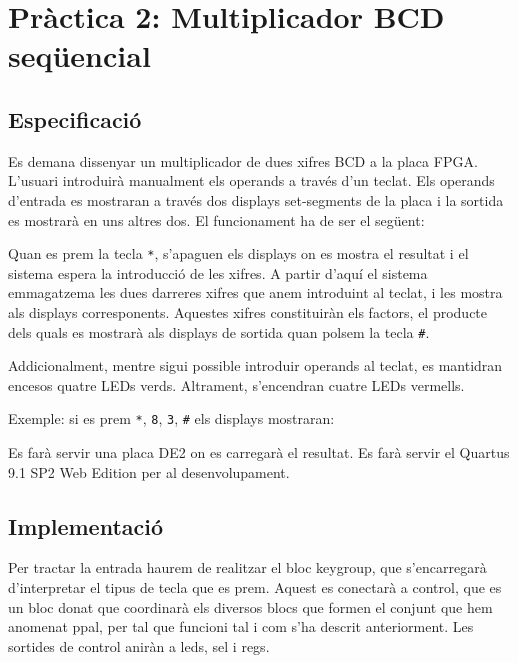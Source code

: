 \chapter{Pràctica 2: Multiplicador BCD seqüencial}

\section{Especificació}

Es demana dissenyar un multiplicador de dues xifres BCD a la placa FPGA. L'usuari introduirà manualment els operands a través d'un teclat. Els operands d'entrada es mostraran a través dos displays set-segments de la placa i la sortida es mostrarà en uns altres dos. El funcionament ha de ser el següent:

Quan es prem la tecla \texttt{*}, s'apaguen els displays on es mostra el resultat i el sistema espera la introducció de les xifres. A partir d'aquí el sistema emmagatzema les dues darreres xifres que anem introduint al teclat, i les mostra als displays corresponents. Aquestes xifres constituiràn els factors, el producte dels quals es mostrarà als displays de sortida quan polsem la tecla \texttt{\#}.

Addicionalment, mentre sigui possible introduir operands al teclat, es mantidran encesos quatre LEDs verds. Altrament, s'encendran cuatre LEDs vermells.

Exemple: si es prem \texttt{*}, \texttt{8}, \texttt{3}, \texttt{\#} els displays mostraran:

\begin{center}
\sevenseg{ }\sevenseg{ } \sevenseg{ }\sevenseg{ }
\end{center}

Es farà servir una placa DE2 on es carregarà el resultat. Es farà servir el Quartus 9.1 SP2 Web Edition per al desenvolupament.

\section{Implementació}

Per tractar la entrada haurem de realitzar el bloc \textsf{keygroup}, que s'encarregarà d'interpretar el tipus de tecla que es prem. Aquest es conectarà a \textsf{control}, que es un bloc donat que coordinarà els diversos blocs que formen el conjunt que hem anomenat \textsf{ppal}, per tal que funcioni tal i com s'ha descrit anteriorment. Les sortides de \textsf{control} aniràn a \textsf{leds}, \textsf{sel} i \textsf{regs}.

